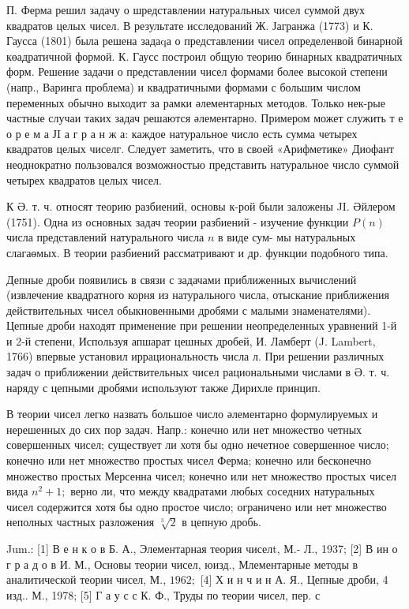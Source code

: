 \documentclass[10pt]{article}
\begin{document}
П. Ферма решил задачу о шредставлении натуральных чисел суммой двух квадратов целых чисел. В результате исследований Ж. Јагранжа (1773) и К. Гаусса (1801) была решена задаqа о представлении чисел определенвой бинарной көадратичной формой. К. Гаусс построил общую теорию бинарных квадратичных форм. Решение задачи о представлении чисел формами более высокоӥ степени (напр., Варинга проблема) и квадратичными формами с большим числом переменных обычно выходит за рамки әлементарных методов. Только нек-рые частные случаи таких задач решаются әлементарно. Примером может служить т е о р е м а ЈI а г р а н ж а: каждое натуральное число есть сумма четырех квадратов целых чиселг. Следует заметить, что в своей «Арифметике» Диофант неоднократно пользовался возможностью представить натуральное число суммой четырех квадратов целых чисел.



К Ә. т. ч. относят теорию разбиений, основы к-рой были заложены JI. Әйлером (1751). Одна из основных задач теории разбиений - изучение функции $P(n)$ числа представлений натурального числа $n$ в виде сум- мы натуральных слагаөмых. В теории разбиений рассматривают и др. функции подобного типа.



Депные дроби появились в связи с задачами приближенных вычислений (извлечение квадратного корня из натурального числа, отыскание приближения действительных чисел обыкновенными дробями с малыми знаменателями). Цепные дроби находят применение при решении неопределенных уравнений 1-й и 2-й степени, Используя апшарат цешных дробей, И. Ламберт (J. Lambert, 1766) впервые установил иррациональность числа л. При решении различных задач о приближении действительных чисел рациональными числами в Ә. т. ч. наряду с цепными дробями используют также Дирихле принцип.



В теории чисел легко назвать большое число әлементарно формулируемых и нерешенных до сих пор задач. Напр.: конечно или нет множество четных совершенных чисел; существует ли хотя бы одно нечетное совершенное число; конечно или нет множество простых чисел Ферма; конечно или бесконечно множество простых Мерсенна чисел; конечно или нет множество простых чисел вида $n^{2}+1 ;$ верно ли, что между квадратами любых соседних натуральных чисел содержится хотя бы одно простое число; ограничено или нет множество неполных частных разложения $\sqrt[3]{2}$ в цепную дробь.



Jum.: [1] В е н к о в Б. А., Элементарная теория чиселt, М.- Л., 1937; [2] В ин о г р а д о в И. М., Основы теории чисел, юизд., Млементарные методы в аналитической теории чисел, М., $1962 ;$ [4] Х и н ч и н А. Я., Цепные дроби, 4 изд.. М., 1978; [5] Г а у с с К. Ф., Труды по теории чисел, пер. с
\end{document}

